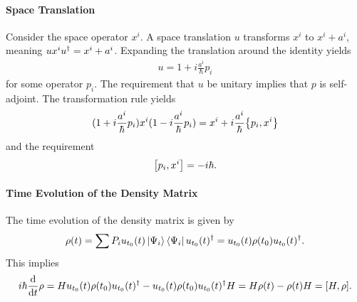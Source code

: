 \paragraph{Space Translation}
Consider the space operator $x^{i}$. A space translation $u$ transforms $x^{i}$ to $x^{i} + a^{i}$, meaning $ux^{i}u^{\dagger} = x^{i} + a^{i}$. Expanding the translation around the identity yields
\begin{align*}
	u = 1 + i\frac{a^{i}}{\hbar}p_{i}
\end{align*}
for some operator $p_{i}$. The requirement that $u$ be unitary implies that $p$ is self-adjoint. The transformation rule yields
\begin{align*}
	(1 + i\frac{a^{i}}{\hbar}p_{i})x^{i}(1 - i\frac{a^{i}}{\hbar}p_{i}) = x^{i} + i\frac{a^{i}}{\hbar}\pb{p_{i}}{x^{i}}
\end{align*}
and the requirement
\begin{align*}
	\comm{p_{i}}{x^{i}} = -i\hbar.
\end{align*}

\paragraph{Time Evolution of the Density Matrix}
The time evolution of the density matrix is given by
\begin{align*}
	\rho(t) = \sum P_{i}u_{t_{0}}(t)\ket{\Psi_{i}}\bra{\Psi_{i}}u_{t_{0}}(t)^{\dagger} = u_{t_{0}}(t)\rho(t_{0})u_{t_{0}}(t)^{\dagger}.
\end{align*}
This implies
\begin{align*}
	i\hbar\dv{t}\rho = Hu_{t_{0}}(t)\rho(t_{0})\adj{u_{t_{0}}(t)} - u_{t_{0}}(t)\rho(t_{0})\adj{u_{t_{0}}(t)}H = H\rho(t) - \rho(t)H = \comm{H}{\rho}.
\end{align*}

